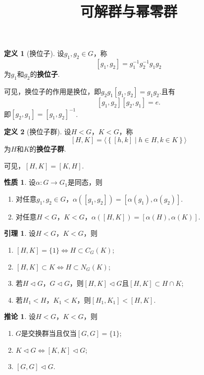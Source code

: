 \documentclass[12pt]{ctexart}
\title{\vspace{-2em}\textbf{可解群与幂零群}\vspace{-2em}}
\date{ }
\theoremstyle{definition}
\newtheorem{definition}{定义}
\newtheorem{lemma}{引理}
\newtheorem{corollary}{推论}
\newtheorem{property}{性质}
\theoremstyle{plain}
\begin{document}
	\maketitle
	\begin{definition}[换位子]
		设$g_1,g_2\in G$，称
		$$\left[g_1,g_2\right]=g_1^{-1}g_2^{-1}g_1g_2$$
		为$g_1$和$g_2$的\textbf{换位子}.
	\end{definition}
	可见，换位子的作用是换位，即$g_2g_1\left[g_1,g_2\right]=g_1g_2$.且有
	$$\left[g_1,g_2\right]\left[g_2,g_1\right]=e.$$
	即$\left[g_2,g_1\right]=\left[g_1,g_2\right]^{-1}$.
	\begin{definition}[换位子群]
		设$H<G$，$K<G$，称
		$$\left[H,K\right]=\langle \left\{\left[h,k\right]\mid h\in H,k\in K\right\}\rangle$$
		为$H$和$K$的\textbf{换位子群}.
	\end{definition}
	可见，$\left[H,K\right]=\left[K,H\right]$.
	\begin{property}
		设$\alpha:G\to G_1$是同态，则
		\begin{enumerate}
			\item 对任意$g_1,g_2\in G$，$\alpha\left(\left[g_1,g_2\right]\right)=\left[\alpha(g_1),\alpha(g_2)\right]$.
			\item 对任意$H<G$，$K<G$，$\alpha\left(\left[H,K\right]\right)=\left[\alpha(H),\alpha(K)\right]$.
		\end{enumerate}
	\end{property}
	\begin{lemma}
		设$H<G$，$K<G$，则
		\begin{enumerate}
			\item $\left[H,K\right]=\{1\}\iff H\subset C_G(K)$;
			\item $\left[H,K\right]\subset K\iff H\subset N_G(K)$;
			\item 若$H\lhd G$，$G\lhd G$，则$\left[H,K\right]\lhd G$且$\left[H,K\right]\subset H\cap K$;
			\item 若$H_1<H$，$K_1<K$，则$\left[H_1,K_1\right]<\left[H,K\right]$.
		\end{enumerate}
	\end{lemma}
	\begin{corollary}
		设$H<G$，$K<G$，则
		\begin{enumerate}
			\item $G$是交换群当且仅当$\left[G,G\right]=\{1\}$;
			\item $K\lhd G\iff \left[K,K\right]\lhd G$;
			\item $\left[G,G\right]\lhd G$.
		\end{enumerate}
	\end{corollary}
\end{document}
